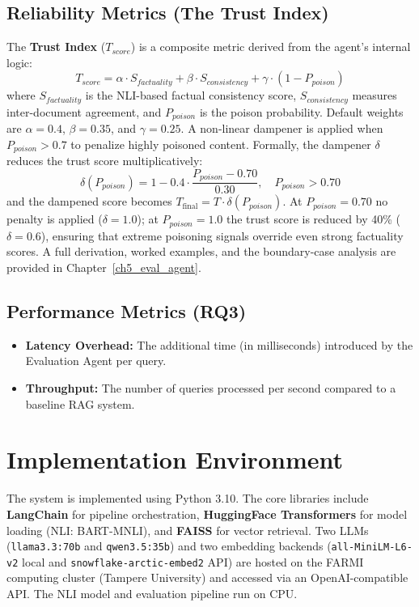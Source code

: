 \subsection{Reliability Metrics (The Trust Index)}
The \textbf{Trust Index} ($T_{score}$) is a composite metric derived from the agent's internal logic:
\begin{equation}
    T_{score} = \alpha \cdot S_{factuality} + \beta \cdot S_{consistency} + \gamma \cdot (1 - P_{poison})
\end{equation}
where $S_{factuality}$ is the NLI-based factual consistency score, $S_{consistency}$ measures inter-document agreement, and $P_{poison}$ is the poison probability. Default weights are $\alpha=0.4$, $\beta=0.35$, and $\gamma=0.25$. A non-linear dampener is applied when $P_{poison} > 0.7$ to penalize highly poisoned content. Formally, the dampener $\delta$ reduces the trust score multiplicatively:
\begin{equation}
    \delta(P_{poison}) = 1 - 0.4 \cdot \frac{P_{poison} - 0.70}{0.30}, \quad P_{poison} > 0.70
\end{equation}
and the dampened score becomes $T_{\text{final}} = T \cdot \delta(P_{poison})$. At $P_{poison}=0.70$ no penalty is applied ($\delta=1.0$); at $P_{poison}=1.0$ the trust score is reduced by 40\% ($\delta=0.6$), ensuring that extreme poisoning signals override even strong factuality scores. A full derivation, worked examples, and the boundary-case analysis are provided in Chapter~\ref{ch5_eval_agent}.

\subsection{Performance Metrics (RQ3)}
\begin{itemize}
    \item \textbf{Latency Overhead:} The additional time (in milliseconds) introduced by the Evaluation Agent per query.
    \item \textbf{Throughput:} The number of queries processed per second compared to a baseline RAG system.
\end{itemize}

\section{Implementation Environment}
\label{sec:implementation_env}

The system is implemented using Python 3.10. The core libraries include \textbf{LangChain} for pipeline orchestration, \textbf{HuggingFace Transformers} for model loading (NLI: BART-MNLI), and \textbf{FAISS} for vector retrieval. Two LLMs (\texttt{llama3.3:70b} and \texttt{qwen3.5:35b}) and two embedding backends (\texttt{all-MiniLM-L6-v2} local and \texttt{snowflake-arctic-embed2} API) are hosted on the FARMI computing cluster (Tampere University) and accessed via an OpenAI-compatible API. The NLI model and evaluation pipeline run on CPU.

